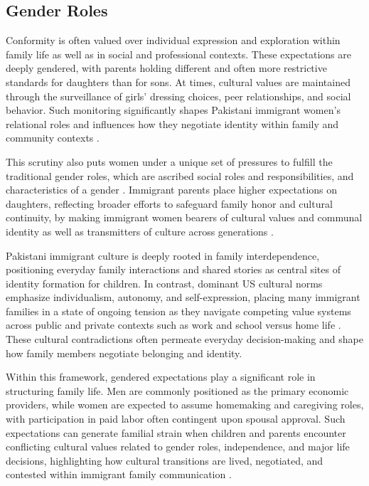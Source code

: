 \subsection{Gender Roles}

Conformity is often valued over individual expression and exploration within family life as well as in social and professional contexts. These expectations are deeply gendered, with parents holding different and often more restrictive standards for daughters than for sons. At times, cultural values are maintained through the surveillance of girls' dressing choices, peer relationships, and social behavior. Such monitoring significantly shapes Pakistani immigrant women’s relational roles and influences how they negotiate identity within family and community contexts \citep{chaudharyTaleTwoGenerations2024, felicianoGenderedPathsEducational2005}.

This scrutiny also puts women under a unique set of pressures to fulfill the traditional gender roles, which are ascribed social roles and responsibilities, and characteristics of a gender \citep{PakistaniImmigrantsSocial, chaudharyTaleTwoGenerations2024}. Immigrant parents place higher expectations on daughters, reflecting broader efforts to safeguard family honor and cultural continuity, by making immigrant women bearers of cultural values and communal identity as well as transmitters of culture across generations \citep[p.~3]{chaudharyTaleTwoGenerations2024}.

Pakistani immigrant culture is deeply rooted in family interdependence, positioning everyday family interactions and shared stories as central sites of identity formation for children. In contrast, dominant US cultural norms emphasize individualism, autonomy, and self-expression, placing many immigrant families in a state of ongoing tension as they navigate competing value systems across public and private contexts such as work and school versus home life \citep{chaudharyTaleTwoGenerations2024, saleemFamilyCommunicationProsocial2021, bhatiaTheorizingIdentityTransnational2009}. These cultural contradictions often permeate everyday decision-making and shape how family members negotiate belonging and identity.

Within this framework, gendered expectations play a significant role in structuring family life. Men are commonly positioned as the primary economic providers, while women are expected to assume homemaking and caregiving roles, with participation in paid labor often contingent upon spousal approval. Such expectations can generate familial strain when children and parents encounter conflicting cultural values related to gender roles, independence, and major life decisions, highlighting how cultural transitions are lived, negotiated, and contested within immigrant family communication \citep{kaliaBufferingParentchildConflict2022}.

